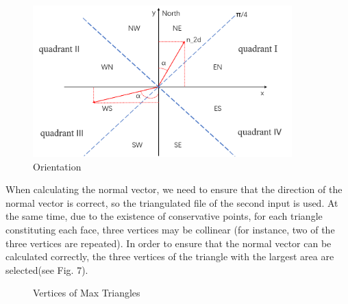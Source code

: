 \documentclass[12pt]{article}
\begin{document}
\begin{figure}[ht] %
\centering
\includegraphics[width=10cm]{figure/orientation-method.png}
\caption{Orientation}
\end{figure}

When calculating the normal vector, we need to ensure that the direction of the normal vector is correct, so the triangulated file of the second input is used. At the same time, due to the existence of conservative points, for each triangle constituting each face, three vertices may be collinear (for instance, two of the three vertices are repeated). In order to ensure that the normal vector can be calculated correctly, the three vertices of the triangle with the largest area are selected(see Fig. 7).
\begin{figure}[htbp]
\centering
{}
\caption{Vertices of Max Triangles}
\end{figure}
\end{document}
